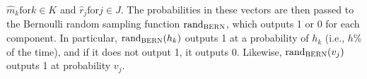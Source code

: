 $\hat{m}_k \text{for} k \in K$ and $\hat{r}_j \text{for} j \in J$.
The probabilities in these vectors are then passed to the Bernoulli random sampling function $\text{rand}_{\textsc{BERN}}$, which outputs 1 or 0 for each component. In particular, 
$\text{rand}_{\textsc{BERN}}(h_k)$ outputs 1 at a probability of $h_k$ (i.e., $h$\% of the time), and if it 
does not output 1, it outputs 0. Likewise, $\text{rand}_{\textsc{BERN}}(v_j)$ outputs 1 at probability $v_j$.


